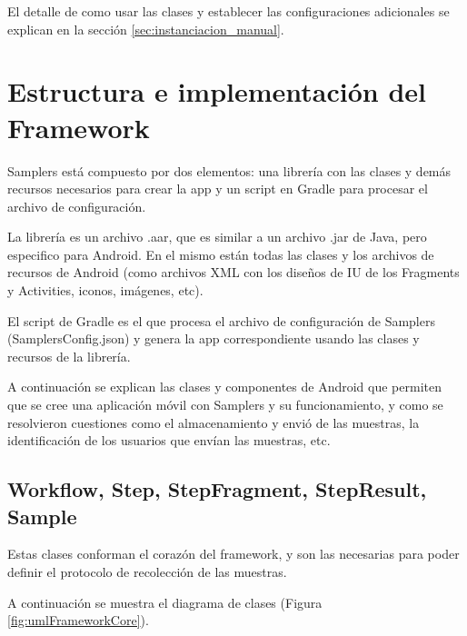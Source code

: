 El detalle de como usar las clases y establecer las configuraciones adicionales se explican en la sección \ref{sec:instanciacion_manual}.

\section{Estructura e implementación del Framework}

Samplers está compuesto por dos elementos: una librería con las clases y demás recursos necesarios para crear la app y un script en Gradle para procesar el archivo de configuración.

La librería es un archivo .aar, que es similar a un archivo .jar de Java, pero especifico para Android. En el mismo están todas las clases y los archivos de recursos de Android (como archivos XML con los diseños de IU de los Fragments y Activities, iconos, imágenes, etc).

El script de Gradle es el que procesa el archivo de configuración de Samplers (SamplersConfig.json) y genera la app correspondiente usando las clases y recursos de la librería.

A continuación se explican las clases y componentes de Android que permiten que se cree una aplicación móvil con Samplers y su funcionamiento, y como se resolvieron cuestiones como el almacenamiento y envió de las muestras, la identificación de los usuarios que envían las muestras, etc.

\subsection{Workflow, Step, StepFragment, StepResult, Sample} \label{sec:clases_core}
Estas clases conforman el corazón del framework, y son las necesarias para poder definir el protocolo de recolección de las muestras.

A continuación se muestra el diagrama de clases (Figura \ref{fig:umlFrameworkCore}).

